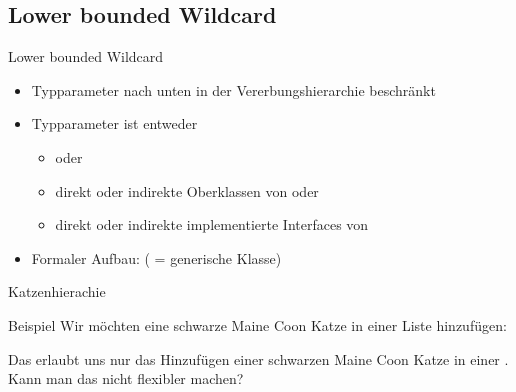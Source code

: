 \documentclass{../tuda-beamer}
\begin{document}
    \subsection{Lower bounded Wildcard}
    \label{subsec:wildcards-lowerbound}
    \begin{frame}[c]{Lower bounded Wildcard}
        \begin{itemize}
            \item Typparameter nach unten in der Vererbungshierarchie beschränkt
            \item Typparameter ist entweder
            \begin{itemize}
                \item {} oder
                \item direkt oder indirekte Oberklassen von  oder
                \item direkt oder indirekte implementierte Interfaces von 
            \end{itemize}
            \item Formaler Aufbau:  ( = generische Klasse)
        \end{itemize}
    \end{frame}

    \begin{frame}[c]{Katzenhierachie}
        
    \end{frame}

    \begin{frame}[c]{Beispiel}
        Wir möchten eine schwarze Maine Coon Katze in einer Liste hinzufügen:

        

        \pause

        Das erlaubt uns nur das Hinzufügen einer schwarzen Maine Coon Katze in einer
        .
        Kann man das nicht flexibler machen?
    \end{frame}

    \begin{frame}[c]
        
    \end{frame}
\end{document}
